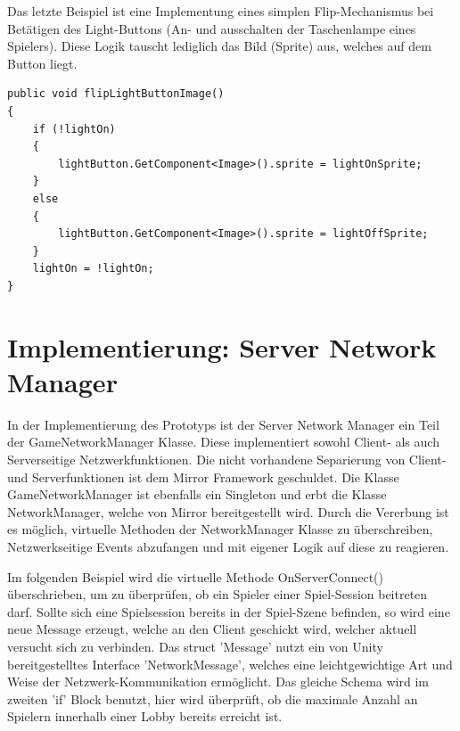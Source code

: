 Das letzte Beispiel ist eine Implementung eines simplen Flip-Mechanismus bei Betätigen des Light-Buttons (An- und ausschalten der Taschenlampe eines Spielers). Diese Logik tauscht lediglich das Bild (Sprite) aus, welches auf dem Button liegt.

\begin{lstlisting}[caption= InGameUiControllerScript.cs flipLightButtonImage]
public void flipLightButtonImage()
{
	if (!lightOn)
	{
		lightButton.GetComponent<Image>().sprite = lightOnSprite;
	}
	else
	{
		lightButton.GetComponent<Image>().sprite = lightOffSprite;
	}
	lightOn = !lightOn;
}
\end{lstlisting}


\section{Implementierung: Server Network Manager}

In der Implementierung des Prototyps ist der Server Network Manager ein Teil der GameNetworkManager Klasse. Diese implementiert sowohl Client- als auch Serverseitige Netzwerkfunktionen. Die nicht vorhandene Separierung von Client-und Serverfunktionen ist dem Mirror Framework geschuldet. Die Klasse GameNetworkManager ist ebenfalls ein Singleton und erbt die Klasse NetworkManager, welche von Mirror bereitgestellt wird. Durch die Vererbung ist es möglich, virtuelle Methoden\cite{Billwagner.08.02.2022} der NetworkManager Klasse zu überschreiben, Netzwerkseitige Events abzufangen und mit eigener Logik auf diese zu reagieren. 

Im folgenden Beispiel wird die virtuelle Methode OnServerConnect() überschrieben, um zu überprüfen, ob ein Spieler einer Spiel-Session beitreten darf. Sollte sich eine Spielsession bereits in der Spiel-Szene befinden, so wird eine neue Message erzeugt, welche an den Client geschickt wird, welcher aktuell versucht sich zu verbinden. Das struct 'Message' nutzt ein von Unity bereitgestelltes Interface 'NetworkMessage', welches eine leichtgewichtige Art und Weise der Netzwerk-Kommunikation ermöglicht. Das gleiche Schema wird im zweiten 'if' Block benutzt, hier wird überprüft, ob die maximale Anzahl an Spielern innerhalb einer Lobby bereits erreicht ist.


